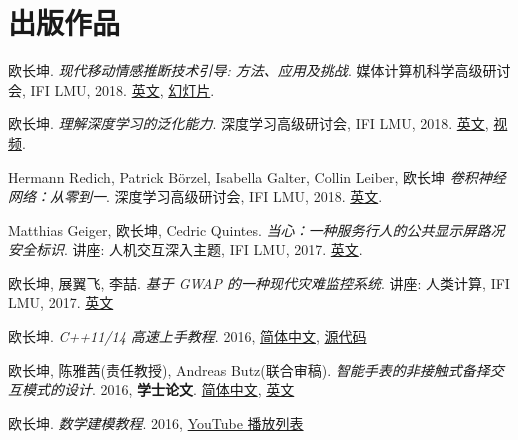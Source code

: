 \section{\textbf{出版作品}}
 \resumeSubHeadingListStart
    \item{
      欧长坤.
      \emph{现代移动情感推断技术引导: 方法、应用及挑战}.
      媒体计算机科学高级研讨会, IFI LMU, 2018. \href{https://github.com/changkun/hs-ws17-mobile-emotion-inference/blob/master/src/lmumihs-ou.pdf}{英文}, \href{https://github.com/changkun/hs-ws17-mobile-emotion-inference/blob/master/slides/presentation-final.pdf}{幻灯片}.
    }
    \item{
      欧长坤.
      \emph{理解深度学习的泛化能力}.
      深度学习高级研讨会, IFI LMU, 2018. \href{https://docs.google.com/presentation/d/1eNUYH9_3bbBO7bONPU8BCTr2DOMC69gdOJvBgpLjwNg/edit#slide=id.g2cdf1dbd0b_1_6}{英文}, \href{https://www.youtube.com/watch?v=z9je5YlnBgI&t=1585s}{视频}.
    }   
    \item{
      Hermann Redich, Patrick Börzel, Isabella Galter, Collin Leiber, 欧长坤
      \emph{卷积神经网络：从零到一}.
      深度学习高级研讨会, IFI LMU, 2018. \href{https://github.com/changkun/talks/blob/master/201712/cnn.pdf}{英文}.
    }
    \item{
        Matthias Geiger, 欧长坤, Cedric Quintes.
        \emph{当心：一种服务行人的公共显示屏路况安全标识}.
        讲座: 人机交互深入主题, IFI LMU, 2017. \href{https://github.com/changkun/ath-windshild-display/blob/master/paper/ath.pdf}{英文}.
    }
    \item{
      欧长坤, 展翼飞, 李喆.
      \emph{基于 GWAP 的一种现代灾难监控系统}.
      讲座: 人类计算, IFI LMU, 2017.
      \href{https://github.com/changkun/hc-ss17-disaster-monitoring/blob/master/report/hc_final_project_report_team_Hotpot.pdf}{英文}
    }
   \item{
       欧长坤.
       \emph{C++11/14 高速上手教程}. 
       2016, 
       \href{https://www.gitbook.com/book/changkun/cpp1x-tutorial/details}{简体中文}, 
       \href{https://github.com/changkun/cpp1x-tutorial}{源代码}
   }
   \item{
       欧长坤, 陈雅茜(责任教授), Andreas Butz(联合审稿).
       \emph{智能手表的非接触式备择交互模式的设计}. 
       2016, \textbf{学士论文}. \href{https://changkun.us/files/cv/bachelor-thesis-cn.html}{简体中文}, 
       \href{https://changkun.us/files/cv/bachelor-thesis-en.html}{英文}
   }
   \item{
       欧长坤.
       \emph{数学建模教程}.
       2016, \href{https://www.youtube.com/watch?v=EUfXE3vP9_A&list=PLwUqqMt5en7c7iZIseCVAS5BX6RPkS-qR}{YouTube 播放列表}
   }

